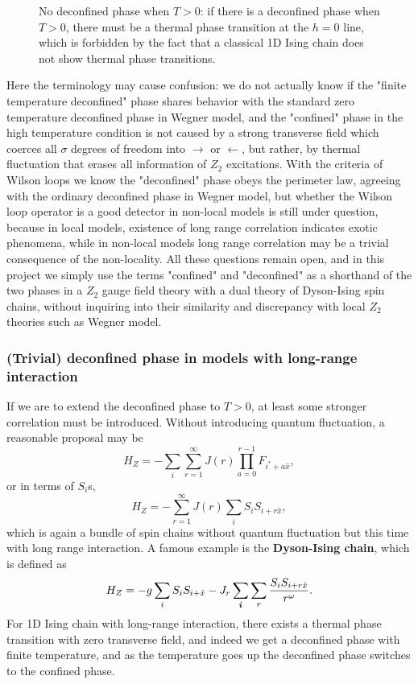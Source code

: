 \documentclass[hyperref, a4paper]{article}
\newcommand*{\concept}[1]{{\textbf{#1}}}
\newcommand*{\Ztwo}{\texorpdfstring{$\mathbb{Z}_2$ }{Z2 }}
\def\mathbb#1{#1}%
\begin{document}
\begin{figure}
    \centering
    
    \caption{No deconfined phase when $T > 0$: if there is a deconfined phase when $T > 0$, there must be a thermal phase transition at the $h=0$ line, which is forbidden by the fact that a classical 1D Ising chain does not show thermal phase transitions.}
    \label{fig:phase-diagram-expected-pure-z2}
\end{figure}

Here the terminology may cause confusion: we do not actually know if the "finite temperature deconfined" phase shares behavior with the standard zero temperature deconfined phase in Wegner model, and the "confined" phase in the high temperature condition is not caused by a strong transverse field which coerces all $\sigma$ degrees of freedom into $\rightarrow$ or $\leftarrow$, but rather, by thermal fluctuation that erases all information of \Ztwo excitations.
With the criteria of Wilson loops we know the "deconfined" phase obeys the perimeter law, agreeing with the ordinary deconfined phase in Wegner model, but whether the Wilson loop operator is a good detector in non-local models is still under question, because in local models, existence of long range correlation indicates exotic phenomena, while in non-local models long range correlation may be a trivial consequence of the non-locality.
All these questions remain open, and in this project we simply use the terms "confined" and "deconfined" as a shorthand of the two phases in a \Ztwo gauge field theory with a dual theory of Dyson-Ising spin chains, without inquiring into their similarity and discrepancy with local \Ztwo theories such as Wegner model.

\subsubsection{(Trivial) deconfined phase in models with long-range interaction}

If we are to extend the deconfined phase to $T>0$, at least some stronger correlation must be introduced.
Without introducing quantum fluctuation, a reasonable proposal may be 
\[
    H_Z = - \sum_i \sum_{r=1}^\infty J(r) \prod_{a=0}^{r-1} F_{i^*+a \hat{x}},
\]
or in terms of $S_i$s,
\[
    H_Z = - \sum_{r=1}^\infty J(r) \sum_i S_i S_{i + r \hat{x}} ,
\]
which is again a bundle of spin chains without quantum fluctuation but this time with long range interaction.
A famous example is the \concept{Dyson-Ising chain}, which is defined as
\[
    H_Z = - g \sum_i S_i S_{i+\hat{x}} - J_r \sum_{\vb*{i}} \sum_r \frac{S_i S_{i + r \hat{x}}}{r^\omega}.
\]
For 1D Ising chain with long-range interaction, there exists a thermal phase transition with zero transverse field, and indeed we get a deconfined phase with finite temperature, and as the temperature goes up the deconfined phase switches to the confined phase.
\end{document}
